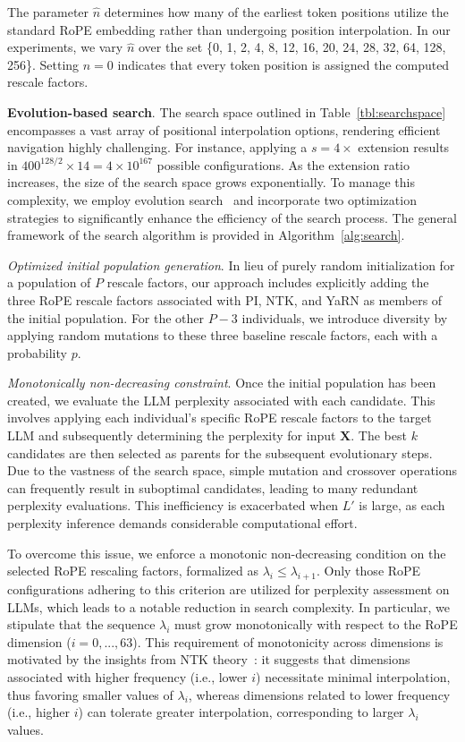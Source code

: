 The parameter $\hat{n}$ determines how many of the earliest token positions utilize the standard RoPE embedding rather than undergoing position interpolation. In our experiments, we vary $\hat{n}$ over the set \{0, 1, 2, 4, 8, 12, 16, 20, 24, 28, 32, 64, 128, 256\}. Setting $\hat{n}=0$ indicates that every token position is assigned the computed rescale factors.

\textbf{Evolution-based search}. The search space outlined in Table~\ref{tbl:searchspace} encompasses a vast array of positional interpolation options, rendering efficient navigation highly challenging. For instance, applying a $s=4\times$ extension results in $400^{128/2}\times14 = 4\times10^{167}$ possible configurations. As the extension ratio increases, the size of the search space grows exponentially. To manage this complexity, we employ evolution search~\cite{guo2020single} and incorporate two optimization strategies to significantly enhance the efficiency of the search process. The general framework of the search algorithm is provided in Algorithm~\ref{alg:search}.

\textit{Optimized initial population generation}. In lieu of purely random initialization for a population of $P$ rescale factors, our approach includes explicitly adding the three RoPE rescale factors associated with PI, NTK, and YaRN as members of the initial population. For the other $P-3$ individuals, we introduce diversity by applying random mutations to these three baseline rescale factors, each with a probability $p$.

\textit{Monotonically non-decreasing constraint}. Once the initial population has been created, we evaluate the LLM perplexity associated with each candidate. This involves applying each individual’s specific RoPE rescale factors to the target LLM and subsequently determining the perplexity for input $\mathbf{X}$. The best $k$ candidates are then selected as parents for the subsequent evolutionary steps. Due to the vastness of the search space, simple mutation and crossover operations can frequently result in suboptimal candidates, leading to many redundant perplexity evaluations. This inefficiency is exacerbated when $L'$ is large, as each perplexity inference demands considerable computational effort.

To overcome this issue, we enforce a monotonic non-decreasing condition on the selected RoPE rescaling factors, formalized as $\lambda_i \le \lambda_{i+1}$. Only those RoPE configurations adhering to this criterion are utilized for perplexity assessment on LLMs, which leads to a notable reduction in search complexity. In particular, we stipulate that the sequence $\lambda_i$ must grow monotonically with respect to the RoPE dimension ($i=0,...,63$). This requirement of monotonicity across dimensions is motivated by the insights from NTK theory~\cite{jacot2018neural,tancik2020fourier,ntk}: it suggests that dimensions associated with higher frequency (i.e., lower $i$) necessitate minimal interpolation, thus favoring smaller values of $\lambda_i$, whereas dimensions related to lower frequency (i.e., higher $i$) can tolerate greater interpolation, corresponding to larger $\lambda_i$ values.

